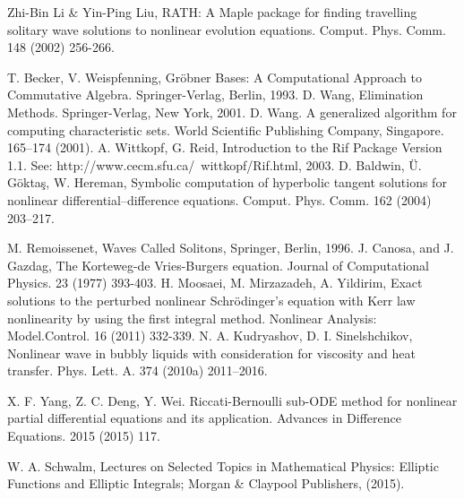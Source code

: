 \documentclass[prd,aps,floats,showkeys,nofootinbib,notitlepage]{revtex4-2}
\begin{document}
\begin{thebibliography}{00}
		 Zhi-Bin Li \& Yin-Ping Liu, RATH: A Maple package for finding travelling solitary wave solutions to nonlinear evolution equations. Comput. Phys. Comm. {148} (2002) 256-266.
		
		 T. Becker, V. Weispfenning, Gr\"obner Bases: A Computational Approach to Commutative Algebra. Springer-Verlag, Berlin, 1993.
		 D. Wang, Elimination Methods. Springer-Verlag, New York, 2001.
		 D. Wang. A generalized algorithm for computing characteristic sets. World Scientific Publishing Company, Singapore. 165–174 (2001). 
		 A. Wittkopf, G. Reid, Introduction to the Rif Package Version 1.1. See: http://www.cecm.sfu.ca/~wittkopf/Rif.html, 2003.
		 D. Baldwin, \"U. G\"okta\c{s}, W. Hereman, Symbolic computation of hyperbolic tangent solutions for nonlinear differential–difference equations. Comput. Phys. Comm. 162 (2004) 203–217.
		
		 M. Remoissenet, Waves Called Solitons, Springer, Berlin, 1996.
		 J. Canosa, and J. Gazdag, The Korteweg-de Vries-Burgers equation. Journal of Computational Physics. 23 (1977) 393-403.
		 H. Moosaei, M. Mirzazadeh, A. Yildirim, Exact  solutions to the perturbed nonlinear Schr\"odinger’s equation with Kerr law nonlinearity by using the first integral method. Nonlinear Analysis: Model.Control. 16 (2011) 332-339.
		  N. A. Kudryashov, D. I. Sinelshchikov, Nonlinear wave in bubbly liquids with consideration for viscosity and heat transfer. Phys. Lett. A. 374 (2010a) 2011–2016.
		
		
		 X. F. Yang, Z. C. Deng, Y. Wei. Riccati-Bernoulli sub-ODE method for nonlinear partial differential equations and its application. Advances in Difference Equations. 2015 (2015) 117.
		 
		W. A. Schwalm, Lectures on Selected Topics in Mathematical Physics: Elliptic Functions and Elliptic Integrals; Morgan \& Claypool Publishers, (2015).

		
		
		
		
	
		
	\end{thebibliography}
	
\end{document}
